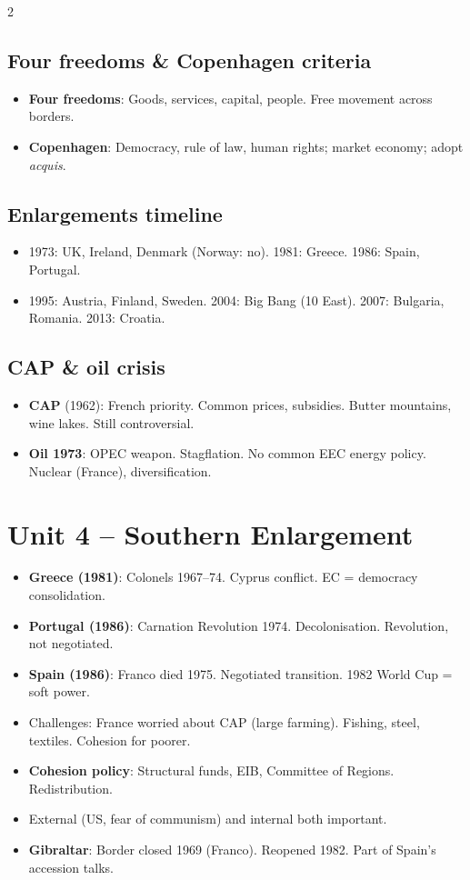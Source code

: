 \documentclass[8pt,landscape,a4paper]{article}
\newcommand{\handnote}[1]{\marginnote{\raggedright\footnotesize\color{notegrey}\textit{#1}\vspace{0.4em}}}
\begin{document}
\begin{multicols}{2}
\subsection*{Four freedoms \& Copenhagen criteria}
\begin{itemize}[leftmargin=*,nosep]
\item \textbf{Four freedoms}: Goods, services, capital, people. Free movement across borders.
\item \textbf{Copenhagen}: Democracy, rule of law, human rights; market economy; adopt \textit{acquis}.
\end{itemize}

\subsection*{Enlargements timeline}
\begin{itemize}[leftmargin=*,nosep]
\item 1973: UK, Ireland, Denmark (Norway: no). 1981: Greece. 1986: Spain, Portugal.
\item 1995: Austria, Finland, Sweden. 2004: Big Bang (10 East). 2007: Bulgaria, Romania. 2013: Croatia.
\end{itemize}

\subsection*{CAP \& oil crisis}
\begin{itemize}[leftmargin=*,nosep]
\item \textbf{CAP} (1962): French priority. Common prices, subsidies. Butter mountains, wine lakes. Still controversial.
\item \textbf{Oil 1973}: OPEC weapon. Stagflation. No common EEC energy policy. Nuclear (France), diversification.
\end{itemize}

\section*{\color{eublue}Unit 4 -- Southern Enlargement}\handnote{Democracy consolidation.}
\begin{itemize}[leftmargin=*,nosep]
\item \textbf{Greece (1981)}: Colonels 1967--74. Cyprus conflict. EC = democracy consolidation.
\item \textbf{Portugal (1986)}: Carnation Revolution 1974. Decolonisation. Revolution, not negotiated.
\item \textbf{Spain (1986)}: Franco died 1975. Negotiated transition. 1982 World Cup = soft power.
\item Challenges: France worried about CAP (large farming). Fishing, steel, textiles. Cohesion for poorer.
\item \textbf{Cohesion policy}: Structural funds, EIB, Committee of Regions. Redistribution.
\item External (US, fear of communism) and internal both important.
\item \textbf{Gibraltar}: Border closed 1969 (Franco). Reopened 1982. Part of Spain's accession talks.
\end{itemize}


\end{multicols}
\end{document}
